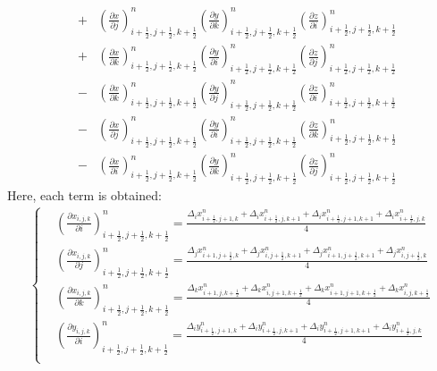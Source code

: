 \begin{enumerate}
\begin{eqnarray}
&+&\left(\frac{\partial x}{\partial j}\right)^n_{i+\frac{1}{2},j+\frac{1}{2},k+\frac{1}{2}}
\left(\frac{\partial y}{\partial k}\right)^n_{i+\frac{1}{2},j+\frac{1}{2},k+\frac{1}{2}}
\left(\frac{\partial z}{\partial i}\right)^n_{i+\frac{1}{2},j+\frac{1}{2},k+\frac{1}{2}}\nonumber\\
&+&\left(\frac{\partial x}{\partial k}\right)^n_{i+\frac{1}{2},j+\frac{1}{2},k+\frac{1}{2}}
\left(\frac{\partial y}{\partial i}\right)^n_{i+\frac{1}{2},j+\frac{1}{2},k+\frac{1}{2}}
\left(\frac{\partial z}{\partial j}\right)^n_{i+\frac{1}{2},j+\frac{1}{2},k+\frac{1}{2}}\nonumber\\
&-&\left(\frac{\partial x}{\partial k}\right)^n_{i+\frac{1}{2},j+\frac{1}{2},k+\frac{1}{2}}
\left(\frac{\partial y}{\partial j}\right)^n_{i+\frac{1}{2},j+\frac{1}{2},k+\frac{1}{2}}
\left(\frac{\partial z}{\partial i}\right)^n_{i+\frac{1}{2},j+\frac{1}{2},k+\frac{1}{2}}\nonumber\\
&-&\left(\frac{\partial x}{\partial j}\right)^n_{i+\frac{1}{2},j+\frac{1}{2},k+\frac{1}{2}}
\left(\frac{\partial y}{\partial i}\right)^n_{i+\frac{1}{2},j+\frac{1}{2},k+\frac{1}{2}}
\left(\frac{\partial z}{\partial k}\right)^n_{i+\frac{1}{2},j+\frac{1}{2},k+\frac{1}{2}}\nonumber\\
&-&\left(\frac{\partial x}{\partial i}\right)^n_{i+\frac{1}{2},j+\frac{1}{2},k+\frac{1}{2}}
\left(\frac{\partial y}{\partial k}\right)^n_{i+\frac{1}{2},j+\frac{1}{2},k+\frac{1}{2}}
\left(\frac{\partial z}{\partial j}\right)^n_{i+\frac{1}{2},j+\frac{1}{2},k+\frac{1}{2}}\nonumber
\end{eqnarray}
	Here, each term is obtained: 
\begin{eqnarray}
\begin{cases}
&(\frac{\partial x_{i,j,k}}{\partial i})^n_{i+\frac{1}{2},j+\frac{1}{2},k+\frac{1}{2}}=\frac{\Delta_i x^n_{i+\frac{1}{2},j+1,k}+\Delta_i x^n_{i+\frac{1}{2},j,k+1}+\Delta_i x^n_{i+\frac{1}{2},j+1,k+1}+\Delta_i x^n_{i+\frac{1}{2},j,k}}{4}\\
&(\frac{\partial x_{i,j,k}}{\partial j})^n_{i+\frac{1}{2},j+\frac{1}{2},k+\frac{1}{2}}=\frac{\Delta_j x^n_{i+1,j+\frac{1}{2},k}+\Delta_j x^n_{i,j+\frac{1}{2},k+1}+\Delta_j x^n_{i+1,j+\frac{1}{2},k+1}+\Delta_j x^n_{i,j+\frac{1}{2},k}}{4}\\
&(\frac{\partial x_{i,j,k}}{\partial k})^n_{i+\frac{1}{2},j+\frac{1}{2},k+\frac{1}{2}}=\frac{\Delta_k x^n_{i+1,j,k+\frac{1}{2}}+\Delta_k x^n_{i,j+1,k+\frac{1}{2}}+\Delta_k x^n_{i+1,j+1,k+\frac{1}{2}}+\Delta_k x^n_{i,j,k+\frac{1}{2}}}{4}\\
&(\frac{\partial y_{i,j,k}}{\partial i})^n_{i+\frac{1}{2},j+\frac{1}{2},k+\frac{1}{2}}=\frac{\Delta_i y^n_{i+\frac{1}{2},j+1,k}+\Delta_i y^n_{i+\frac{1}{2},j,k+1}+\Delta_i y^n_{i+\frac{1}{2},j+1,k+1}+\Delta_i y^n_{i+\frac{1}{2},j,k}}{4}\\

\end{cases}
\end{eqnarray}
\end{enumerate}
